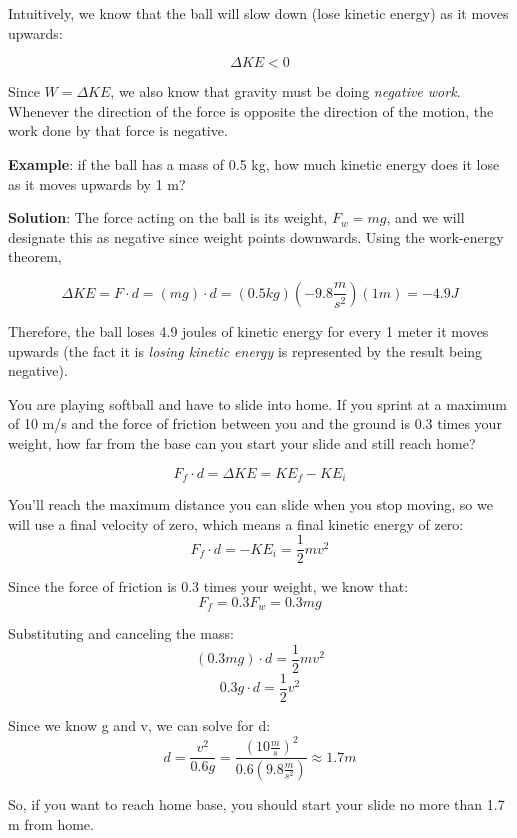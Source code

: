 \begin{center}
\end{center}

Intuitively, we know that the ball will slow down (lose kinetic energy) as it 
moves upwards:

$$\Delta KE < 0$$

Since $W = \Delta KE$, we also know that gravity must be doing \textit{negative 
work}. Whenever the direction of the force is opposite the direction of the 
motion, the work done by that force is negative. 

\textbf{Example}: if the ball has a mass of 0.5 kg, how much kinetic energy 
does it lose as it moves upwards by 1 m?

\textbf{Solution}: The force acting on the ball is its weight, $F_w = mg$, and we 
will designate this as negative since weight points downwards. Using the 
work-energy theorem, 

$$\Delta KE = F \cdot d = \left( mg \right) \cdot d = \left( 0.5 kg \right) \left(
-9.8 \frac{m}{s^2} \right) \left( 1 m \right) = -4.9 J$$

Therefore, the ball loses 4.9 joules of kinetic energy for every 1 meter it moves 
upwards (the fact it is \textit{losing kinetic energy} is represented by the 
result being negative).

\begin{Exercise}[title = {How far will you slide?}, label = slide]
You are playing softball and have to slide into home. If you sprint at a maximum 
of 10 m/s and the force of friction between you and the ground is 0.3 times your 
weight, how far from the base can you start your slide and still reach home?
\end{Exercise}

\begin{Answer}[ref = slide]
$$F_f \cdot d = \Delta KE = KE_f - KE_i$$

You'll reach the maximum distance you can slide when you stop moving, so we will 
use a final velocity of zero, which means a final kinetic energy of zero:
$$F_f \cdot d = -KE_i = \frac{1}{2}mv^2$$

Since the force of friction is 0.3 times your weight, we know that:
$$F_f = 0.3 F_w = 0.3mg$$

Substituting and canceling the mass:
$$\left( 0.3 mg \right) \cdot d = \frac{1}{2}mv^2$$
$$0.3g \cdot d = \frac{1}{2}v^2$$

Since we know g and v, we can solve for d:
$$d = \frac{v^2}{0.6g} = \frac{\left( 10 \frac{m}{s} \right)^2}{0.6 \left( 9.8 
\frac{m}{s^2} \right)} \approx 1.7 m$$

So, if you want to reach home base, you should start your slide no more than 
1.7 m from home. 
\end{Answer}

